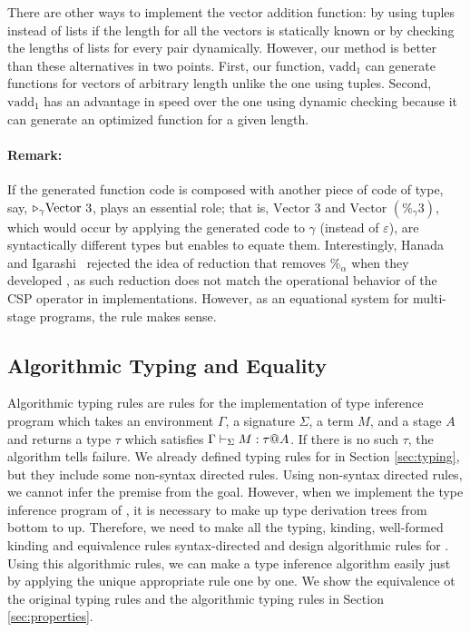There are other ways to implement the vector addition function: by using tuples
instead of lists if the length for all the vectors is statically known or by
checking the lengths of lists for every pair dynamically.  However, our method
is better than these alternatives in two points.  First, our function,
$\text{vadd}_1$ can generate functions for vectors of arbitrary length unlike
the one using tuples.  Second, $\text{vadd}_1$ has an advantage in speed over
the one using dynamic checking because it can generate an optimized function
for a given length.

\paragraph{Remark:}
If the generated function code is composed with another piece of code of type, say,
\({\mathop{\triangleright}}_\gamma \text{Vector }3\), \QPercent{} plays an essential role; that is,
\(\text{Vector }3\) and \(\text{Vector }(\%_\gamma 3)\), which would occur
by applying the generated code to \(\gamma\) (instead of \(\varepsilon\)), are syntactically
different types but \QPercent{} enables to equate them.
Interestingly, Hanada and Igarashi~\cite{HanadaIgarashi2014CSP} rejected the idea of
reduction that removes $\%_\alpha$ when they developed \LTP{}, as such
reduction does not match the operational behavior of the CSP operator in
implementations. However, as an equational system for multi-stage programs,
the rule \QPercent{} makes sense.

\subsection{Algorithmic Typing and Equality}
\label{sec:algorithmic-typing-and-equality}


Algorithmic typing rules are rules for the implementation of type inference
program which takes an environment \( \Gamma \), a signature \( \Sigma \), a
term \( M \), and a stage \( A \) and returns a type \( \tau \) which satisfies
\( \Gamma \vdash_\Sigma M : \tau @ A \). If there is no such \( \tau \), the algorithm tells
failure.  We already defined typing rules for \LMD in Section \ref{sec:typing},
but they include some non-syntax directed rules. Using non-syntax directed
rules, we cannot infer the premise from the goal. However, when we implement
the type inference program of \LMD, it is necessary to make up type derivation
trees from bottom to up.  Therefore, we need to make all the typing, kinding,
well-formed kinding and equivalence rules syntax-directed and design
algorithmic rules for \LMD. Using this algorithmic rules, we can
make a type inference algorithm easily just by applying the unique appropriate
rule one by one. We show the equivalence ot the original typing rules and the
algorithmic typing rules in Section \ref{sec:properties}.


